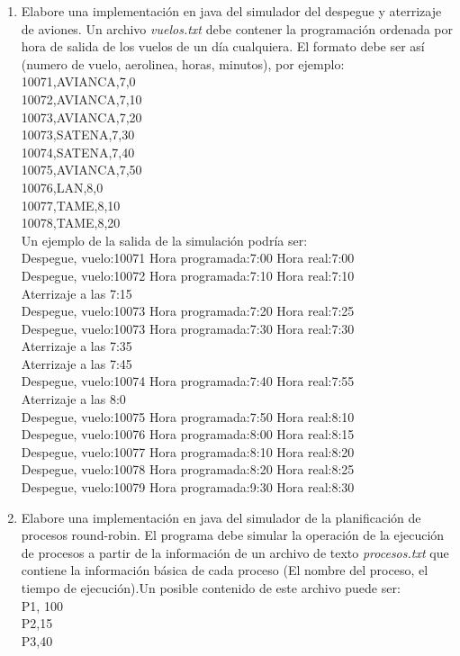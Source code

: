 \begin{enumerate}
	\item Elabore una implementación en java del simulador del despegue y aterrizaje de aviones. Un archivo \textit{vuelos.txt} debe contener la programación ordenada por hora de salida de los vuelos de un día cualquiera. El formato debe ser así (numero de vuelo, aerolinea, horas, minutos), por ejemplo:\\
	10071,AVIANCA,7,0\\
	10072,AVIANCA,7,10\\
	10073,AVIANCA,7,20\\
	10073,SATENA,7,30\\
	10074,SATENA,7,40\\
	10075,AVIANCA,7,50\\
	10076,LAN,8,0\\
	10077,TAME,8,10\\
	10078,TAME,8,20\\
	
	Un ejemplo de la salida de la simulación podría ser:\\
	Despegue, vuelo:10071 Hora programada:7:00 Hora real:7:00\\
	Despegue, vuelo:10072 Hora programada:7:10 Hora real:7:10\\
	Aterrizaje a las 7:15\\
	Despegue, vuelo:10073 Hora programada:7:20 Hora real:7:25\\
	Despegue, vuelo:10073 Hora programada:7:30 Hora real:7:30\\
	Aterrizaje a las 7:35\\
	Aterrizaje a las 7:45\\
	Despegue, vuelo:10074 Hora programada:7:40 Hora real:7:55\\
	Aterrizaje a las 8:0\\
	Despegue, vuelo:10075 Hora programada:7:50 Hora real:8:10\\
	Despegue, vuelo:10076 Hora programada:8:00 Hora real:8:15\\
	Despegue, vuelo:10077 Hora programada:8:10 Hora real:8:20\\
	Despegue, vuelo:10078 Hora programada:8:20 Hora real:8:25\\
	Despegue, vuelo:10079 Hora programada:9:30 Hora real:8:30\\
	
	\item Elabore una implementación en java del simulador de la planificación de procesos round-robin. El programa debe simular la operación de la ejecución de procesos a partir de la información de un archivo de texto \textit{procesos.txt} que contiene la información básica de cada proceso (El nombre del proceso, el tiempo de ejecución).Un posible contenido de este archivo puede ser:\\
	P1, 100\\
	P2,15\\
	P3,40\\
	

\end{enumerate}

